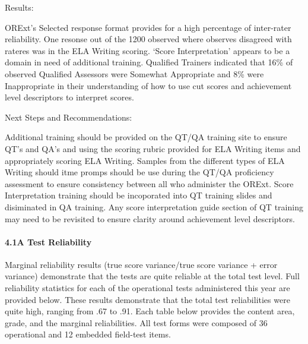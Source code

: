 \documentclass[]{article}
\let\oldparagraph\paragraph
\renewcommand{\paragraph}[1]{\oldparagraph{#1}\mbox{}}
\begin{document}
Results:

ORExt's Selected response format provides for a high percentage of
inter-rater reliability. One resonse out of the 1200 observed where
observes disagreed with rateres was in the ELA Writing scoring. `Score
Interpretation' appears to be a domain in need of additional training.
Qualified Trainers indicated that 16\% of observed Qualified Assessors
were Somewhat Appropriate and 8\% were Inappropriate in their
understanding of how to use cut scores and achievement level descriptors
to interpret scores.

Next Steps and Recommendations:

Additional training should be provided on the QT/QA training site to
ensure QT's and QA's and using the scoring rubric provided for ELA
Writing items and appropriately scoring ELA Writing. Samples from the
different types of ELA Writing should itme promps should be use during
the QT/QA proficiency assessment to ensure consistency between all who
administer the ORExt. Score Interpretation training should be
incoporated into QT training slides and disiminated in QA training. Any
score interpretation guide section of QT training may need to be
revisited to ensure clarity around achievement level descriptors.

\hypertarget{a-test-reliability}{%
\paragraph{4.1A Test Reliability}\label{a-test-reliability}}

Marginal reliability results (true score variance/true score variance +
error variance) demonstrate that the tests are quite reliable at the
total test level. Full reliability statistics for each of the
operational tests administered this year are provided below. These
results demonstrate that the total test reliabilities were quite high,
ranging from .67 to .91. Each table below provides the content area,
grade, and the marginal reliabilities. All test forms were composed of
36 operational and 12 embedded field-test items.
\end{document}
